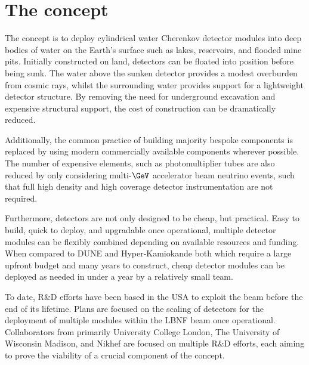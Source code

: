 \section{The \chips concept} %
\label{sec:chips_concept} %

The \chips concept is to deploy cylindrical water Cherenkov detector modules into deep bodies of
water on the Earth's surface such as lakes, reservoirs, and flooded mine pits. Initially
constructed on land, \chips detectors can be floated into position before being sunk. The water
above the sunken detector provides a modest overburden from cosmic rays, whilst the surrounding
water provides support for a lightweight detector structure. By removing the need for underground
excavation and expensive structural support, the cost of construction can be dramatically reduced.

Additionally, the common practice of building majority bespoke components is replaced by using
modern commercially available components wherever possible. The number of expensive elements, such
as photomultiplier tubes are also reduced by only considering multi-$\GeV$ accelerator beam
neutrino events, such that full high density and high coverage detector instrumentation are not
required.

Furthermore, \chips detectors are not only designed to be cheap, but practical. Easy to build,
quick to deploy, and upgradable once operational, multiple detector modules can be flexibly
combined depending on available resources and funding. When compared to DUNE and Hyper-Kamiokande
both which require a large upfront budget and many years to construct, cheap \chips detector
modules can be deployed as needed in under a year by a relatively small team.

To date, \chips R\&D efforts have been based in the USA to exploit the \numi beam before the end
of its lifetime. Plans are focused on the scaling of \chips detectors for the deployment of
multiple modules within the LBNF beam once operational. Collaborators from primarily University
College London, The University of Wisconsin Madison, and Nikhef are focused on multiple R\&D
efforts, each aiming to prove the viability of a crucial component of the \chips concept.

